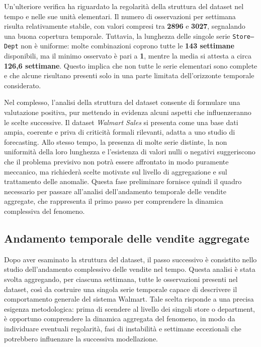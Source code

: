 \documentclass[a4paper,12pt]{article}
\begin{document}
Un’ulteriore verifica ha riguardato la regolarità della struttura del dataset nel tempo e nelle sue unità elementari. Il numero di osservazioni per settimana risulta relativamente stabile, con valori compresi tra \textbf{2896} e \textbf{3027}, segnalando una buona copertura temporale. Tuttavia, la lunghezza delle singole serie \texttt{Store--Dept} non è uniforme: molte combinazioni coprono tutte le \textbf{143 settimane} disponibili, ma il minimo osservato è pari a \textbf{1}, mentre la media si attesta a circa \textbf{126,6 settimane}. Questo implica che non tutte le serie elementari sono complete e che alcune risultano presenti solo in una parte limitata dell’orizzonte temporale considerato.

Nel complesso, l’analisi della struttura del dataset consente di formulare una valutazione positiva, pur mettendo in evidenza alcuni aspetti che influenzeranno le scelte successive. Il dataset \textit{Walmart Sales} si presenta come una base dati ampia, coerente e priva di criticità formali rilevanti, adatta a uno studio di forecasting. Allo stesso tempo, la presenza di molte serie distinte, la non uniformità della loro lunghezza e l’esistenza di valori nulli o negativi suggeriscono che il problema previsivo non potrà essere affrontato in modo puramente meccanico, ma richiederà scelte motivate sul livello di aggregazione e sul trattamento delle anomalie. Questa fase preliminare fornisce quindi il quadro necessario per passare all’analisi dell’andamento temporale delle vendite aggregate, che rappresenta il primo passo per comprendere la dinamica complessiva del fenomeno.

\subsection{Andamento temporale delle vendite aggregate}

Dopo aver esaminato la struttura del dataset, il passo successivo è consistito nello studio dell’andamento complessivo delle vendite nel tempo. Questa analisi è stata svolta aggregando, per ciascuna settimana, tutte le osservazioni presenti nel dataset, così da costruire una singola serie temporale capace di descrivere il comportamento generale del sistema Walmart. Tale scelta risponde a una precisa esigenza metodologica: prima di scendere al livello dei singoli store o department, è opportuno comprendere la dinamica aggregata del fenomeno, in modo da individuare eventuali regolarità, fasi di instabilità e settimane eccezionali che potrebbero influenzare la successiva modellazione.
\end{document}
